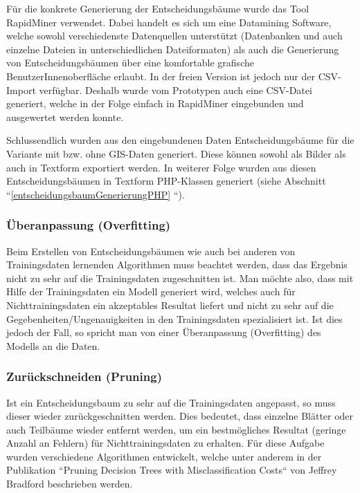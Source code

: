 Für die konkrete Generierung der Entscheidungsbäume wurde das Tool RapidMiner verwendet. Dabei handelt es sich um eine Datamining Software, welche sowohl verschiedenste Datenquellen unterstützt (Datenbanken und auch einzelne Dateien in unterschiedlichen Dateiformaten) als auch die Generierung von Entscheidungsbäumen über eine komfortable grafische BenutzerInnenoberfläche erlaubt. In der freien Version ist jedoch nur der CSV-Import verfügbar. Deshalb wurde vom Prototypen auch eine CSV-Datei generiert, welche in der Folge einfach in RapidMiner eingebunden und ausgewertet werden konnte. 

Schlussendlich wurden aus den eingebundenen Daten Entscheidungsbäume für die Variante mit bzw. ohne GIS-Daten generiert. Diese können sowohl als Bilder als auch in Textform exportiert werden. In weiterer Folge wurden aus diesen Entscheidungsbäumen in Textform PHP-Klassen generiert (siehe Abschnitt ``\ref{entscheidungsbaumGenerierungPHP} ``).

\subsubsection{Überanpassung (Overfitting)}
Beim Erstellen von Entscheidungsbäumen wie auch bei anderen von Trainingsdaten lernenden Algorithmen muss beachtet werden, dass das Ergebnis nicht zu sehr auf die Trainingsdaten zugeschnitten ist. Man möchte also, dass mit Hilfe der Trainingsdaten ein Modell generiert wird, welches auch für Nichttrainingsdaten ein akzeptables Resultat liefert und nicht zu sehr auf die Gegebenheiten/Ungenauigkeiten in den Trainingsdaten spezialisiert ist. Ist dies jedoch der Fall, so spricht man von einer Überanpassung (Overfitting) des Modells an die Daten.  \cite{tom_dietterich_overfitting_1995}

\subsubsection{Zurückschneiden (Pruning)}
Ist ein Entscheidungsbaum zu sehr  auf die Trainingsdaten angepasst, so muss dieser wieder zurückgeschnitten werden. Dies bedeutet, dass einzelne Blätter oder auch Teilbäume wieder entfernt werden, um ein bestmögliches Resultat (geringe Anzahl an Fehlern) für Nichttrainingsdaten zu erhalten. Für diese Aufgabe wurden verschiedene Algorithmen entwickelt, welche unter anderem in der Publikation ``Pruning Decision Trees with Misclassification Costs`` von Jeffrey Bradford beschrieben werden. \cite{jeffrey_p._bradford_pruning_1998}

